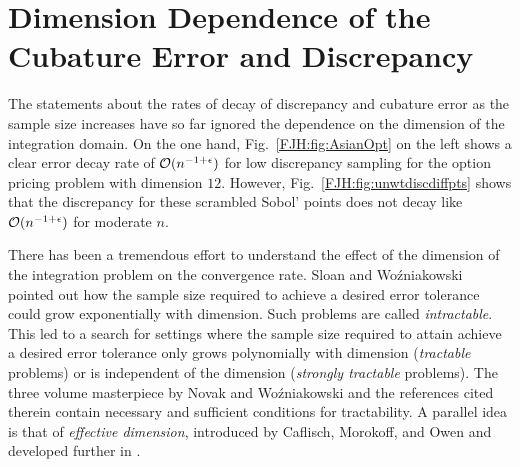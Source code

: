 \documentclass[graybox,footinfo]{svmult}
\begin{document}
\section{Dimension Dependence of the Cubature Error and Discrepancy} 
\label{FJH:sec:Tract}
The statements about the rates of decay of discrepancy and cubature error as the 
sample size increases have so far ignored the dependence on the dimension of the 
integration domain.  On the one hand, Fig.\ \ref{FJH:fig:AsianOpt} on the left shows a 
clear error 
decay rate of ${\mathcal{O}}(n^{-1 + \epsilon})$ for low discrepancy sampling for the option 
pricing problem with dimension $12$.  However, Fig.\ \ref{FJH:fig:unwtdiscdiffpts} shows 
that the discrepancy for these scrambled Sobol' points does not decay like ${\mathcal{O}}(n^{-1 
+ \epsilon})$ for moderate $n$.  

There has been a tremendous effort to 
understand the effect of the dimension of the integration problem on the convergence 
rate.  Sloan and Wo\'zniakowski \cite{SloWoz97} pointed out how
the sample size required to achieve a desired error tolerance could grow exponentially 
with 
dimension.  Such problems are called \emph{intractable}.  This led to a search for 
settings where the sample size required to attain achieve a desired error tolerance only 
grows polynomially with dimension (\emph{tractable} problems) or is independent of the 
dimension (\emph{strongly tractable} problems). The three volume masterpiece by Novak 
and Wo\'zniakowski \cite{NovWoz08a,NovWoz10a,NovWoz12a} and the references cited 
therein contain necessary and sufficient conditions for tractability.  A parallel idea is that 
of \emph{effective dimension}, introduced by Caflisch, Morokoff, 
and Owen \cite{CafMorOwe97} and developed further in \cite{LiuOwe04a}.
\end{document}
